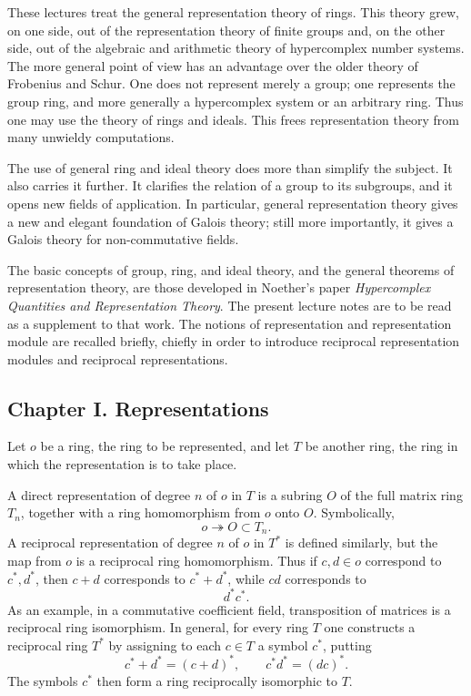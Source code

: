 \documentclass[12pt]{article}
\begin{document}
These lectures treat the general representation theory of rings. This theory grew, on one side, out of the representation theory of finite groups and, on the other side, out of the algebraic and arithmetic theory of hypercomplex number systems. The more general point of view has an advantage over the older theory of Frobenius and Schur. One does not represent merely a group; one represents the group ring, and more generally a hypercomplex system or an arbitrary ring. Thus one may use the theory of rings and ideals. This frees representation theory from many unwieldy computations.

The use of general ring and ideal theory does more than simplify the subject. It also carries it further. It clarifies the relation of a group to its subgroups, and it opens new fields of application. In particular, general representation theory gives a new and elegant foundation of Galois theory; still more importantly, it gives a Galois theory for non-commutative fields.

The basic concepts of group, ring, and ideal theory, and the general theorems of representation theory, are those developed in Noether's paper \textit{Hypercomplex Quantities and Representation Theory}. The present lecture notes are to be read as a supplement to that work. The notions of representation and representation module are recalled briefly, chiefly in order to introduce reciprocal representation modules and reciprocal representations.

\subsection{Chapter I. Representations}

Let \(o\) be a ring, the ring to be represented, and let \(T\) be another ring, the ring in which the representation is to take place.

A direct representation of degree \(n\) of \(o\) in \(T\) is a subring \(O\) of the full matrix ring \(T_n\), together with a ring homomorphism from \(o\) onto \(O\). Symbolically,
\[
  o\twoheadrightarrow O\subset T_n.
\]
A reciprocal representation of degree \(n\) of \(o\) in \(T^*\) is defined similarly, but the map from \(o\) is a reciprocal ring homomorphism. Thus if \(c,d\in o\) correspond to \(c^*,d^*\), then \(c+d\) corresponds to \(c^*+d^*\), while \(cd\) corresponds to
\[
  d^*c^*.
\]
As an example, in a commutative coefficient field, transposition of matrices is a reciprocal ring isomorphism. In general, for every ring \(T\) one constructs a reciprocal ring \(T^*\) by assigning to each \(c\in T\) a symbol \(c^*\), putting
\[
  c^*+d^*=(c+d)^*,\qquad c^*d^*=(dc)^*.
\]
The symbols \(c^*\) then form a ring reciprocally isomorphic to \(T\).
\end{document}
